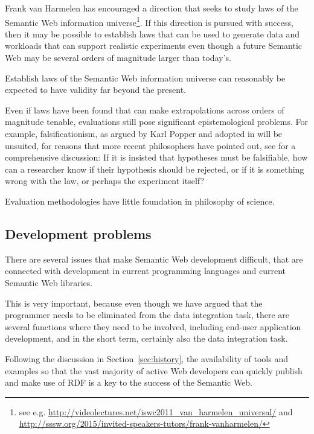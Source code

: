 Frank van Harmelen has encouraged a direction that seeks to study laws
of the Semantic Web information universe\footnote{see
  e.g. \url{http://videolectures.net/iswc2011_van_harmelen_universal/}
  and
  \url{http://sssw.org/2015/invited-speakers-tutors/frank-vanharmelen/}}.
If this direction is pursued with success, then it may be possible to
establish laws that can be used to generate data and workloads that
can support realistic experiments even though a future Semantic Web
may be several orders of magnitude larger than today's.


\begin{problem}\label{prob:lawsfuture}
Establish laws of the Semantic Web information universe can reasonably be
expected to have validity far beyond the present.
\end{problem}

Even if laws have been found that can make extrapolations across
orders of magnitude tenable, evaluations still pose significant
epistemological problems. For example, falsificationism, as argued by
Karl Popper and adopted in \cite{avinatguide} will be unsuited, for
reasons that more recent philosophers have pointed out, see
\cite{chalmers1999whatis} for a comprehensive discussion: If it is
insisted that hypotheses must be falsifiable, how can a researcher
know if their hypothesis should be rejected, or if it is something
wrong with the law, or perhaps the experiment itself?


\begin{problem}\label{prob:badphil}
Evaluation methodologies have little foundation in philosophy of science.
\end{problem}


\subsection{Development problems}\label{sec:devproblems}

There are several issues that make Semantic Web development difficult,
that are connected with development in current programming languages
and current Semantic Web libraries.

This is very important, because even though we have argued that the
programmer needs to be eliminated from the data integration task,
there are several functions where they need to be involved, including
end-user application development, and in the short term, certainly
also the data integration task. 

Following the discussion in Section~\ref{sec:history}, the
availability of tools and examples so that the vast majority of active
Web developers can quickly publish and make use of RDF is a key to the
success of the Semantic Web.

